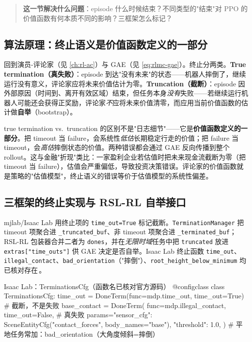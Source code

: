 \begin{quote}\small
\textbf{这一节解决什么问题}：episode 什么时候结束？不同类型的"结束"对 PPO 的价值函数有何本质不同的影响？三框架怎么标记？
\end{quote}

\subsection{算法原理：终止语义是价值函数定义的一部分}
\label{sec:rlmc-rew-termsemantics}

回到演员-评论家（见 \cref{ch:rl-ac}）与 GAE（见 \cref{eq:rlmc-gae}）。终止分两类。\textbf{True termination（真失败）}：episode 到达"没有未来"的状态——机器人摔倒了，继续运行没有意义，评论家应将未来价值估计为零。\textbf{Truncation（截断）}：episode 因外部原因（时间到、离开有效区域）结束，但任务本身\emph{没有}失败——若继续运行机器人可能还会获得正奖励，评论家\emph{不}应将未来价值清零，而应用当前价值函数的估计做\textbf{自举}（bootstrap）。

\begin{insight}[本质洞察：错标终止 = 给评论家错误的训练 target]\label{ins:rlmc-rew-bootstrap}
true termination vs.\ truncation 的区别不是"日志细节"——它是\textbf{价值函数定义的一部分}。把 timeout 当 failure，会系统性\emph{低估}长期稳定行走的价值；把 failure 当 timeout，会\emph{高估}摔倒状态的价值。两种错误都会通过 GAE 反向传播到整个 rollout。这与金融"折现"类比：一家盈利企业若估值时把未来现金流截断为零（把 timeout 当 failure），估值会严重偏低，导致投资决策错误。评论家的价值函数就是策略的"估值模型"，终止语义的错误等价于估值模型的系统性偏差。
\end{insight}

\subsection{三框架的终止实现与 RSL-RL 自举接口}
\label{sec:rlmc-rew-termimpl}

mjlab/Isaac Lab 用终止项的 \verb|time_out=True| 标记截断。\verb|TerminationManager| 把 timeout 项聚合进 \verb|_truncated_buf|、非 timeout 项聚合进 \verb|_terminated_buf|；RSL-RL 包装器合并二者为 \verb|dones|，并在\emph{无限时域}任务中把 \verb|truncated| 放进 \verb|extras["time_outs"]| 供 GAE 决定是否自举。Isaac Lab 终止函数 \verb|time_out|、\verb|illegal_contact|、\verb|bad_orientation|（"摔倒"）、\verb|root_height_below_minimum| 均已核对存在\,\cite{isaaclab2024}。

\begin{codebox}[Python]{Isaac Lab：TerminationsCfg（函数名已核对官方源码）}
@configclass
class TerminationsCfg:
    time_out = DoneTerm(func=mdp.time_out, time_out=True)        # 截断，不是失败
    base_contact = DoneTerm(
        func=mdp.illegal_contact, time_out=False,                # 真失败
        params={"sensor_cfg": SceneEntityCfg("contact_forces",
                body_names="base"), "threshold": 1.0},
    )
    # 平地任务常加：bad_orientation（大角度倾斜=摔倒）
\end{codebox}

